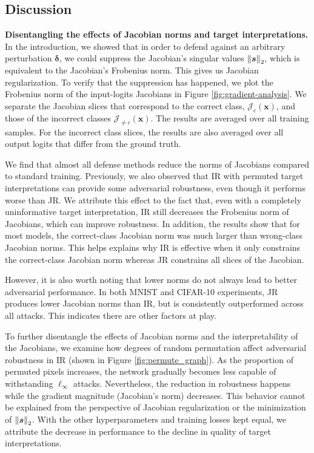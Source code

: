 \subsection{Discussion} \label{subsec:discussion}

\textbf{Disentangling the effects of Jacobian norms and target interpretations.} \label{subsubsec:disentangling_mag_pattern}In the introduction, we showed that in order to defend against an arbitrary perturbation $\bm \delta$, we could suppress the Jacobian's singular values $\left\lVert\bm s\right\rVert_2$, which is equivalent to  the Jacobian's Frobenius norm. This gives us Jacobian regularization. To verify that the suppression has happened, we plot the Frobenius norm of the input-logits Jacobians in Figure \ref{fig:gradient-analysis}. We separate the Jacobian slices that correspond to the correct class, $\mathcal{J}_c(\bm{x})$, and those of the incorrect classes $\mathcal{J}_{\neq c}(\bm{x})$. The results are averaged over all training samples. For the incorrect class slices, the results are also averaged over all output logits that differ from the ground truth. 

We find that almost all defense methods reduce the norms of Jacobians compared to standard training. Previously, we also observed that IR with permuted target interpretations can provide some adversarial robustness, even though it performs worse than JR. We attribute this effect to the fact that, even with a completely uninformative target interpretation, IR still decreases the Frobenius norm of Jacobians, which can improve robustness. 
%
In addition, the results show that for most models, the correct-class Jacobian norm was much larger than wrong-class Jacobian norms. This helps explains why IR is effective when it only constrains the correct-class Jacobian norm whereas JR constrains all slices of the Jacobian. 

However, it is also worth noting that lower norms do not always lead to better adversarial performance. In both MNIST and CIFAR-10 experiments, JR produces lower Jacobian norms than IR, but is consistently outperformed across all attacks. This indicates there are other factors at play. 

To further disentangle the effects of Jacobian norms and the interpretability of the Jacobians, we examine how degrees of random permutation affect adversarial robustness in IR (shown in Figure \ref{fig:permute_graph}). As the proportion of permuted pixels increases, the network gradually becomes less capable of withstanding $\ell_\infty$ attacks. Nevertheless, the reduction in robustness happens while the gradient magnitude (Jacobian's norm) decreases. This behavior cannot be explained from the perspective of Jacobian regularization or the minimization of $\left\lVert\bm s\right\rVert_2$. With the other hyperparameters and training losses kept equal, we attribute the decrease in performance to the decline in quality of target interpretations.  


